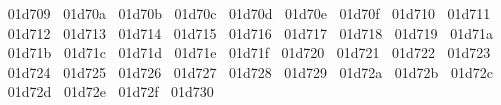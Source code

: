 {  ^^^^^^01d709%
  ^^^^^^01d70a%
  ^^^^^^01d70b%
  ^^^^^^01d70c%
  ^^^^^^01d70d%
  ^^^^^^01d70e%
  ^^^^^^01d70f%
  ^^^^^^01d710%
  ^^^^^^01d711%
  ^^^^^^01d712%
  ^^^^^^01d713%
  ^^^^^^01d714%
  ^^^^^^01d715%
  ^^^^^^01d716%
  ^^^^^^01d717%
  ^^^^^^01d718%
  ^^^^^^01d719%
  ^^^^^^01d71a%
  ^^^^^^01d71b%
  ^^^^^^01d71c%
  ^^^^^^01d71d%
  ^^^^^^01d71e%
  ^^^^^^01d71f%
  ^^^^^^01d720%
  ^^^^^^01d721%
  ^^^^^^01d722%
  ^^^^^^01d723%
  ^^^^^^01d724%
  ^^^^^^01d725%
  ^^^^^^01d726%
  ^^^^^^01d727%
  ^^^^^^01d728%
  ^^^^^^01d729%
  ^^^^^^01d72a%
  ^^^^^^01d72b%
  ^^^^^^01d72c%
  ^^^^^^01d72d%
  ^^^^^^01d72e%
  ^^^^^^01d72f%
  ^^^^^^01d730%
}
